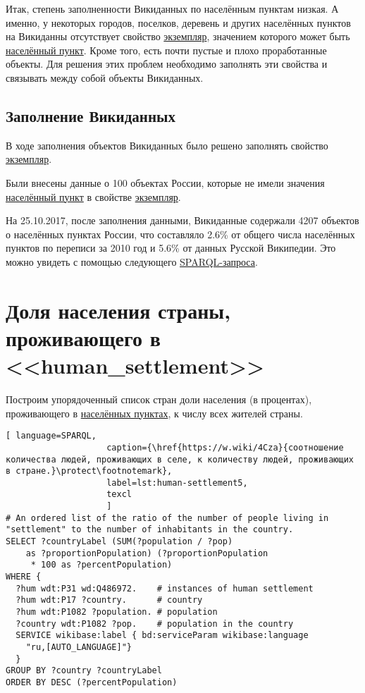 Итак, степень заполненности Викиданных по населённым пунктам низкая. А именно, у некоторых городов, поселков, деревень и других населённых пунктов на Викиданны отсутствует свойство \href{http://www.wikidata.org/entity/Q21503252}{экземпляр}, значением которого может быть \href{http://www.wikidata.org/entity/Q486972}{населённый пункт}. Кроме того, есть почти пустые и плохо проработанные объекты. Для решения этих проблем необходимо заполнять эти свойства и связывать между собой объекты Викиданных.

\subsection{Заполнение Викиданных}

В ходе заполнения объектов Викиданных было решено заполнять свойство \href{http://www.wikidata.org/entity/Q21503252}{экземпляр}.

Были внесены данные о \num{100} объектах России, которые не имели значения \href{http://www.wikidata.org/entity/Q486972}{населённый пункт} в свойстве \href{http://www.wikidata.org/entity/Q21503252}{экземпляр}.

На 25.10.2017, после заполнения данными, Викиданные содержали \num{4207} объектов о населённых пунктах России, что составляло \num{2,6}\% от общего числа населённых пунктов по переписи за 2010 год и \num{5,6}\% от данных Русской Википедии. Это можно увидеть с помощью следующего \href{https://w.wiki/4FVE}{SPARQL-запроса}.

\section{Доля населения страны, проживающего в <<human\_settlement>>}

Построим упорядоченный список стран доли населения (в процентах), проживающего в \href{http://www.wikidata.org/entity/Q486972}{населённых пунктах}, к числу всех жителей страны.

\begin{lstlisting}[ language=SPARQL, 
                    caption={\href{https://w.wiki/4Cza}{соотношение количества людей, проживающих в селе, к количеству людей, проживающих в стране.}\protect\footnotemark},
                    label=lst:human-settlement5,
                    texcl 
                    ]
# An ordered list of the ratio of the number of people living in 
"settlement" to the number of inhabitants in the country.
SELECT ?countryLabel (SUM(?population / ?pop) 
	as ?proportionPopulation) (?proportionPopulation
	 * 100 as ?percentPopulation)
WHERE {
  ?hum wdt:P31 wd:Q486972.    # instances of human settlement  
  ?hum wdt:P17 ?country.      # country 
  ?hum wdt:P1082 ?population. # population
  ?country wdt:P1082 ?pop.    # population in the country
  SERVICE wikibase:label { bd:serviceParam wikibase:language 
	"ru,[AUTO_LANGUAGE]"}
  }
GROUP BY ?country ?countryLabel
ORDER BY DESC (?percentPopulation)
\end{lstlisting}%

